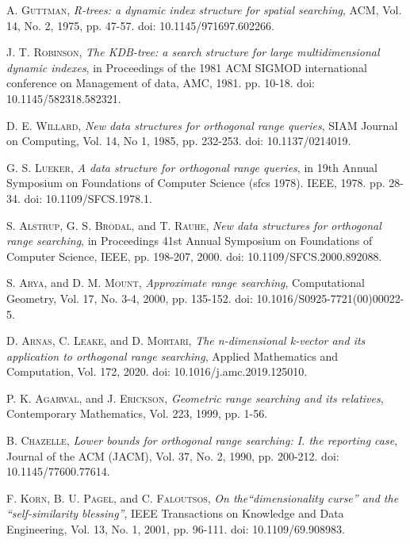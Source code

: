 \documentclass[review]{elsarticle}
\begin{document}
\begin{thebibliography}{00}
 \textsc{A. Guttman},
\textit{R-trees: a dynamic index structure for spatial searching}, ACM, Vol. 14, No. 2, 1975, pp. 47-57. doi: 10.1145/971697.602266.

 \textsc{J. T. Robinson},
\textit{The KDB-tree: a search structure for large multidimensional dynamic indexes}, in Proceedings of the 1981 ACM SIGMOD international conference on Management of data, AMC, 1981. pp. 10-18. doi: 10.1145/582318.582321.

 \textsc{D. E. Willard},
\textit{New data structures for orthogonal range queries}, SIAM Journal on Computing, Vol. 14, No 1, 1985, pp. 232-253. doi: 10.1137/0214019.

 \textsc{G. S. Lueker},
\textit{A data structure for orthogonal range queries}, in 19th Annual Symposium on Foundations of Computer Science (sfcs 1978). IEEE, 1978. pp. 28-34. doi: 10.1109/SFCS.1978.1.

 \textsc{S. Alstrup, G. S. Brodal}, and \textsc{T. Rauhe},
\textit{New data structures for orthogonal range searching}, in Proceedings 41st Annual Symposium on Foundations of Computer Science, IEEE, pp. 198-207, 2000. doi: 10.1109/SFCS.2000.892088.

 \textsc{S. Arya}, and \textsc{D. M. Mount},
\textit{Approximate range searching}, Computational Geometry, Vol. 17, No. 3-4, 2000, pp. 135-152. doi: 10.1016/S0925-7721(00)00022-5.

 \textsc{D. Arnas, C. Leake}, and \textsc{D. Mortari},
\textit{The n-dimensional k-vector and its application to orthogonal range searching}, Applied Mathematics and Computation, Vol. 172, 2020. doi: 10.1016/j.amc.2019.125010.

 \textsc{P. K. Agarwal}, and \textsc{J. Erickson},
\textit{Geometric range searching and its relatives}, Contemporary Mathematics, Vol. 223, 1999, pp. 1-56.

 \textsc{B. Chazelle},
\textit{Lower bounds for orthogonal range searching: I. the reporting case}, Journal of the ACM (JACM), Vol. 37, No. 2, 1990, pp. 200-212. doi: 10.1145/77600.77614.

 \textsc{F. Korn, B. U. Pagel}, and \textsc{C. Faloutsos},
\textit{On the``dimensionality curse'' and the ``self-similarity blessing''}, IEEE Transactions on Knowledge and Data Engineering, Vol. 13, No. 1, 2001, pp. 96-111. doi: 10.1109/69.908983.

\end{thebibliography}
\end{document}
